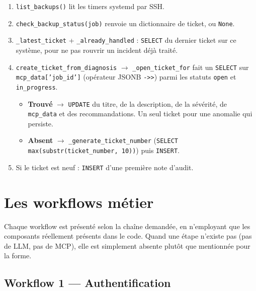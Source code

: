 \documentclass[11pt,a4paper]{report}
\newcommand{\fn}[1]{\texttt{\small\textcolor{oasisviolet}{#1}}}
\newcommand{\arrowto}{\ensuremath{\rightarrow}}
\begin{document}
\begin{enumerate}
  \item \fn{list\_backups()} lit les timers systemd par SSH.
  \item \fn{check\_backup\_status(job)} renvoie un dictionnaire de ticket, ou
  \texttt{None}.
  \item \fn{\_latest\_ticket} + \fn{\_already\_handled} : \texttt{SELECT} du
  dernier ticket sur ce système, pour ne pas rouvrir un incident déjà traité.
  \item \fn{create\_ticket\_from\_diagnosis} \arrowto{} \fn{\_open\_ticket\_for}
  fait un \texttt{SELECT} sur \texttt{mcp\_data['job\_id']} (opérateur JSONB
  \texttt{->>}) parmi les statuts \texttt{open} et \texttt{in\_progress}.
  \begin{itemize}
    \item \textbf{Trouvé} \arrowto{} \texttt{UPDATE} du titre, de la description,
    de la sévérité, de \texttt{mcp\_data} et des recommandations. Un seul ticket
    pour une anomalie qui persiste.
    \item \textbf{Absent} \arrowto{} \fn{\_generate\_ticket\_number}
    (\texttt{SELECT max(substr(ticket\_number, 10))}) puis \texttt{INSERT}.
  \end{itemize}
  \item Si le ticket est neuf : \texttt{INSERT} d'une première note d'audit.
\end{enumerate}

\chapter{Les workflows métier}
\label{ch:workflows}

Chaque workflow est présenté selon la chaîne demandée, en n'employant que les
composants réellement présents dans le code. Quand une étape n'existe pas (pas
de LLM, pas de MCP), elle est simplement absente plutôt que mentionnée pour la
forme.

\section{Workflow 1 --- Authentification}
\end{document}
